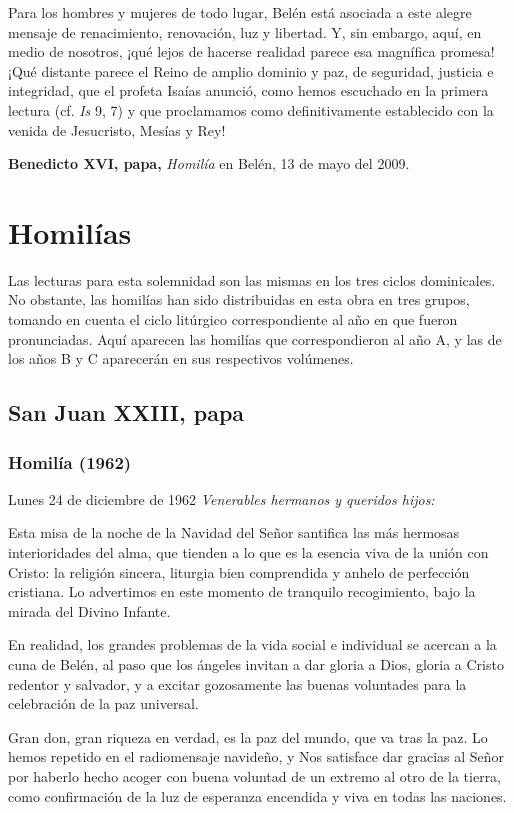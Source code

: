 \begin{body}
\begin{body}
Para los hombres y mujeres de todo lugar, Belén está asociada a este alegre mensaje de renacimiento, renovación, luz y libertad. Y, sin embargo, aquí, en medio de nosotros, ¡qué lejos de hacerse realidad parece esa magnífica promesa! ¡Qué distante parece el Reino de amplio dominio y paz, de seguridad, justicia e integridad, que el profeta Isaías anunció, como hemos escuchado en la primera lectura (cf. \emph{Is} 9, 7) y que proclamamos como definitivamente establecido con la venida de Jesucristo, Mesías y Rey!

\textbf{Benedicto XVI, papa,} \emph{Homilía} en Belén, 13 de mayo del 2009.


\section{Homilías}

Las lecturas para esta solemnidad son las mismas en los tres ciclos dominicales. No obstante, las homilías han sido distribuidas en esta obra en tres grupos, tomando en cuenta el ciclo litúrgico correspondiente al año en que fueron pronunciadas. Aquí aparecen las homilías que correspondieron al año A, y las de los años B y C aparecerán en sus respectivos volúmenes.


\subsection{San Juan XXIII, papa}

\subsubsection{Homilía (1962)}

Lunes 24 de diciembre de 1962 \emph{Venerables hermanos y queridos hijos:}

Esta misa de la noche de la Navidad del Señor santifica las más hermosas interioridades del alma, que tienden a lo que es la esencia viva de la unión con Cristo: la religión sincera, liturgia bien comprendida y anhelo de perfección cristiana. Lo advertimos en este momento de tranquilo recogimiento, bajo la mirada del Divino Infante.

En realidad, los grandes problemas de la vida social e individual se acercan a la cuna de Belén, al paso que los ángeles invitan a dar gloria a Dios, gloria a Cristo redentor y salvador, y a excitar gozosamente las buenas voluntades para la celebración de la paz universal.

Gran don, gran riqueza en verdad, es la paz del mundo, que va tras la paz. Lo hemos repetido en el radiomensaje navideño, y Nos satisface dar gracias al Señor por haberlo hecho acoger con buena voluntad de un extremo al otro de la tierra, como confirmación de la luz de esperanza encendida y viva en todas las naciones.


\end{body}
\end{body}
